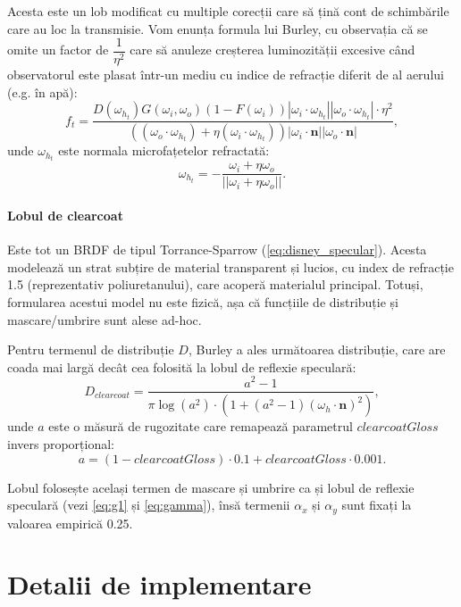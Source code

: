 \documentclass[12pt,a4paper]{report}
\numberwithin{equation}{section} %
\begin{document}
Acesta este un lob modificat cu multiple corecții care să țină cont de schimbările
care au loc la transmisie. Vom enunța formula lui Burley, cu observația că se omite
un factor de $\dfrac{1}{\eta^2}$ care să anuleze creșterea luminozității excesive
când observatorul este plasat într-un mediu cu indice de refracție diferit de al aerului
(e.g. în apă):
\begin{equation}\label{eq:disney_transmission}
	f_{t} = \dfrac{D(\omega_{h_t})G(\omega_i, \omega_o)(1 - F(\omega_i))|\omega_i\cdot\omega_{h_t}||\omega_o\cdot\omega_{h_t}|\cdot\eta^2}{((\omega_o\cdot\omega_{h_t}) + \eta(\omega_i\cdot\omega_{h_t}))|\omega_i\cdot\mathbf{n}||\omega_o\cdot\mathbf{n}|},
\end{equation}
unde $\omega_{h_t}$ este normala microfațetelor refractată:
\begin{equation}
	\omega_{h_t} = -\dfrac{\omega_i + \eta\omega_o}{||\omega_i + \eta\omega_o||}.
\end{equation}

\subsubsection*{Lobul de clearcoat}

Este tot un BRDF de tipul Torrance-Sparrow (\ref{eq:disney_specular}). Acesta
modelează un strat subțire de material transparent și lucios, cu index de refracție 1.5
(reprezentativ poliuretanului), care acoperă materialul principal. Totuși, formularea
acestui model nu este fizică, așa că funcțiile de distribuție și mascare/umbrire sunt
alese ad-hoc.

Pentru termenul de distribuție $D$, Burley a ales următoarea distribuție, care
are coada mai largă decât cea folosită la lobul de reflexie speculară:
\begin{equation}
	D_{clearcoat} = \dfrac{a^2 - 1}{\pi\log(a^2)\cdot (1 + (a^2 - 1)(\omega_h\cdot\mathbf{n})^2)},
\end{equation}
unde $a$ este o măsură de rugozitate care remapează parametrul $clearcoatGloss$ invers proporțional:
\begin{equation}
	a = (1 - clearcoatGloss)\cdot 0.1 + clearcoatGloss\cdot 0.001.
\end{equation}

Lobul folosește același termen de mascare
și umbrire ca și lobul de reflexie speculară (vezi \ref{eq:g1} și \ref{eq:gamma}),
însă termenii $\alpha_x$ și $\alpha_y$ sunt fixați la valoarea empirică 0.25.


\chapter{\label{sec:implementare}Detalii de implementare}
\end{document}
